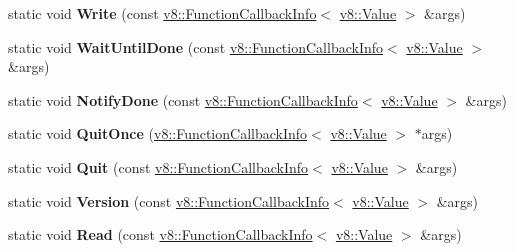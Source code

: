 \begin{DoxyCompactItemize}
\item 
\mbox{\label{classv8_1_1Shell_afd3888490889c1e9be9599cf4a2bad4f}} 
static void {\bfseries Write} (const \mbox{\hyperlink{classv8_1_1FunctionCallbackInfo}{v8\+::\+Function\+Callback\+Info}}$<$ \mbox{\hyperlink{classv8_1_1Value}{v8\+::\+Value}} $>$ \&args)
\item 
\mbox{\label{classv8_1_1Shell_a2a71cc45c6fa1803cffde30aa51e8002}} 
static void {\bfseries Wait\+Until\+Done} (const \mbox{\hyperlink{classv8_1_1FunctionCallbackInfo}{v8\+::\+Function\+Callback\+Info}}$<$ \mbox{\hyperlink{classv8_1_1Value}{v8\+::\+Value}} $>$ \&args)
\item 
\mbox{\label{classv8_1_1Shell_a4e485e54f9a05bf62acc81a1fa57f77d}} 
static void {\bfseries Notify\+Done} (const \mbox{\hyperlink{classv8_1_1FunctionCallbackInfo}{v8\+::\+Function\+Callback\+Info}}$<$ \mbox{\hyperlink{classv8_1_1Value}{v8\+::\+Value}} $>$ \&args)
\item 
\mbox{\label{classv8_1_1Shell_ae7ab8288337d8e4ef62c9e8b65c5138e}} 
static void {\bfseries Quit\+Once} (\mbox{\hyperlink{classv8_1_1FunctionCallbackInfo}{v8\+::\+Function\+Callback\+Info}}$<$ \mbox{\hyperlink{classv8_1_1Value}{v8\+::\+Value}} $>$ $\ast$args)
\item 
\mbox{\label{classv8_1_1Shell_a0ba86babc520a8e061820fab8fbccbbb}} 
static void {\bfseries Quit} (const \mbox{\hyperlink{classv8_1_1FunctionCallbackInfo}{v8\+::\+Function\+Callback\+Info}}$<$ \mbox{\hyperlink{classv8_1_1Value}{v8\+::\+Value}} $>$ \&args)
\item 
\mbox{\label{classv8_1_1Shell_a67d9a8c0c96e9cf9a6bb22703ad019e7}} 
static void {\bfseries Version} (const \mbox{\hyperlink{classv8_1_1FunctionCallbackInfo}{v8\+::\+Function\+Callback\+Info}}$<$ \mbox{\hyperlink{classv8_1_1Value}{v8\+::\+Value}} $>$ \&args)
\item 
\mbox{\label{classv8_1_1Shell_a05de5538b7e495ce8402923d15b16512}} 
static void {\bfseries Read} (const \mbox{\hyperlink{classv8_1_1FunctionCallbackInfo}{v8\+::\+Function\+Callback\+Info}}$<$ \mbox{\hyperlink{classv8_1_1Value}{v8\+::\+Value}} $>$ \&args)
\item 

\end{DoxyCompactItemize}
